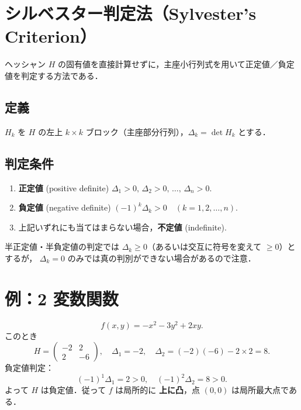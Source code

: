 \documentclass[11pt]{jsarticle}
\begin{document}
\section{シルベスター判定法（Sylvester's Criterion）}
ヘッシャン \(H\) の固有値を直接計算せずに，主座小行列式を用いて正定値／負定値を判定する方法である．

\subsection*{定義}
\(H_{k}\) を \(H\) の左上 \(k\times k\) ブロック（主座部分行列），\(\Delta_{k}=\det H_{k}\) とする．

\subsection*{判定条件}
\begin{enumerate}
  \item \textbf{正定値} (positive definite)\quad
        \(\Delta_{1}>0,\,\Delta_{2}>0,\,\dots,\,\Delta_{n}>0\).
  \item \textbf{負定値} (negative definite)\quad
        \((-1)^{k}\Delta_{k}>0\quad(k=1,2,\dots,n)\).
  \item 上記いずれにも当てはまらない場合，\textbf{不定値} (indefinite).
\end{enumerate}
半正定値・半負定値の判定では \(\Delta_{k}\ge0\)（あるいは交互に符号を変えて \(\ge0\)）とするが，
\(\Delta_{k}=0\) のみでは真の判別ができない場合があるので注意．

\section{例：2 変数関数}
\[
  f(x,y)=-x^{2}-3y^{2}+2xy.
\]
このとき
\[
  H=\begin{pmatrix}-2 & 2\\ 2 & -6\end{pmatrix},\quad
  \Delta_{1}=-2,\quad
  \Delta_{2}=(-2)(-6)-2\times2=8.
\]
負定値判定：
\[
  (-1)^{1}\Delta_{1}=2>0,\quad (-1)^{2}\Delta_{2}=8>0.
\]
よって \(H\) は負定値．従って \(f\) は局所的に \textbf{上に凸}，点 \((0,0)\) は局所最大点である．
\end{document}
